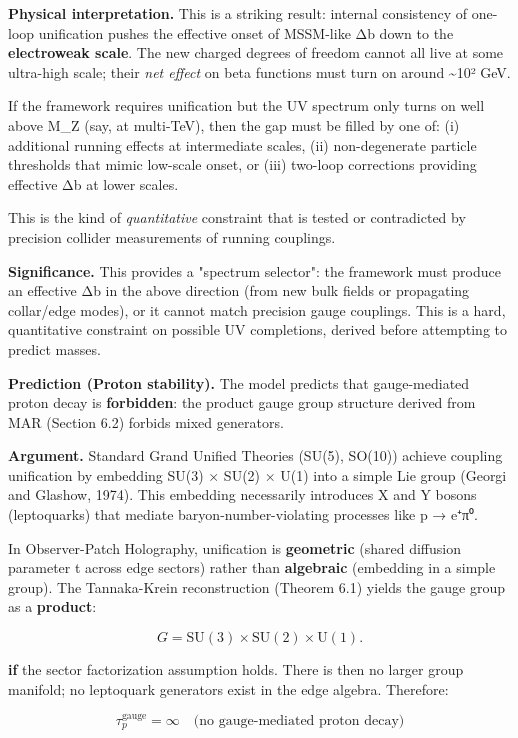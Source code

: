 \textbf{Physical interpretation.} This is a striking result: internal consistency of one-loop unification pushes the effective onset of MSSM-like Δb down to the \textbf{electroweak scale}. The new charged degrees of freedom cannot all live at some ultra-high scale; their \emph{net effect} on beta functions must turn on around \textasciitilde10² GeV.

If the framework requires unification but the UV spectrum only turns on well above M\_Z (say, at multi-TeV), then the gap must be filled by one of: (i) additional running effects at intermediate scales, (ii) non-degenerate particle thresholds that mimic low-scale onset, or (iii) two-loop corrections providing effective Δb at lower scales.

This is the kind of \emph{quantitative} constraint that is tested or contradicted by precision collider measurements of running couplings.

\textbf{Significance.} This provides a "spectrum selector": the framework must produce an effective Δb in the above direction (from new bulk fields or propagating collar/edge modes), or it cannot match precision gauge couplings. This is a hard, quantitative constraint on possible UV completions, derived before attempting to predict masses.

\textbf{Prediction (Proton stability).} The model predicts that gauge-mediated proton decay is \textbf{forbidden}: the product gauge group structure derived from MAR (Section 6.2) forbids mixed generators.

\textbf{Argument.} Standard Grand Unified Theories (SU(5), SO(10)) achieve coupling unification by embedding SU(3) × SU(2) × U(1) into a simple Lie group (Georgi and Glashow, 1974). This embedding necessarily introduces X and Y bosons (leptoquarks) that mediate baryon-number-violating processes like p → e⁺π⁰.

In Observer-Patch Holography, unification is \textbf{geometric} (shared diffusion parameter t across edge sectors) rather than \textbf{algebraic} (embedding in a simple group). The Tannaka-Krein reconstruction (Theorem 6.1) yields the gauge group as a \textbf{product}:

\[
G = \mathrm{SU}(3) \times \mathrm{SU}(2) \times \mathrm{U}(1).
\]

\textbf{if} the sector factorization assumption holds. There is then no larger group manifold; no leptoquark generators exist in the edge algebra. Therefore:

\[
\tau_p^{\mathrm{gauge}} = \infty \quad \text{(no gauge-mediated proton decay)}
\]


